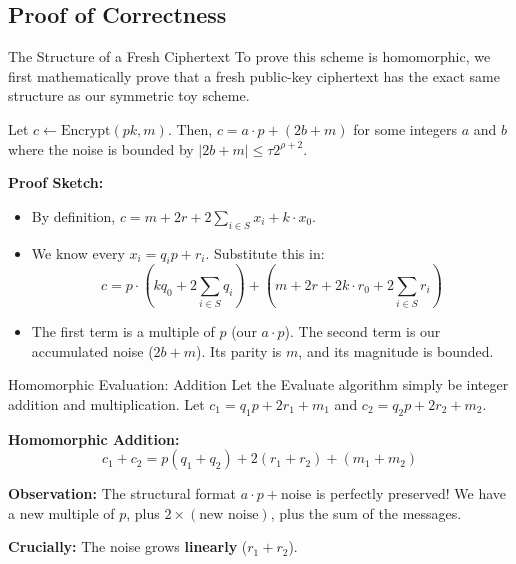 \documentclass[10pt,handout]{beamer}
\begin{document}
\subsection{Proof of Correctness}

\begin{frame}{The Structure of a Fresh Ciphertext}
    To prove this scheme is homomorphic, we first mathematically prove that a fresh public-key ciphertext has the exact same structure as our symmetric toy scheme.
    \pause
    
    \begin{lemma}
    Let $c \leftarrow \text{Encrypt}(pk, m)$. Then, $c = a\cdot p + (2b + m)$ for some integers $a$ and $b$ where the noise is bounded by $|2b+m| \le \tau 2^{\rho+2}$.
    \end{lemma}
    \pause
    
    \vspace{0.3cm}
    \textbf{Proof Sketch:}
    \begin{itemize}
        \item By definition, $c = m + 2r + 2\sum_{i \in S} x_i + k \cdot x_0$.
        \item We know every $x_i = q_i p + r_i$. Substitute this in:
        $$c = p \cdot \left(kq_0 + 2\sum_{i \in S} q_i\right) + \left(m + 2r + 2k \cdot r_0 + 2\sum_{i \in S} r_i\right)$$
        \item The first term is a multiple of $p$ (our $a \cdot p$). The second term is our accumulated noise ($2b+m$). Its parity is $m$, and its magnitude is bounded.
    \end{itemize}
\end{frame}

\begin{frame}{Homomorphic Evaluation: Addition}
    Let the Evaluate algorithm simply be integer addition and multiplication. 
    Let $c_1 = q_1 p + 2r_1 + m_1$ and $c_2 = q_2 p + 2r_2 + m_2$.
    \pause

    \vspace{0.3cm}
    \textbf{Homomorphic Addition:}
    $$c_1 + c_2 = p(q_1 + q_2) + 2(r_1 + r_2) + (m_1 + m_2)$$
    \pause
    
    \vspace{0.3cm}
    \textbf{Observation:}
    The structural format $a\cdot p + \text{noise}$ is perfectly preserved! We have a new multiple of $p$, plus $2 \times (\text{new noise})$, plus the sum of the messages. 
    
    \vspace{0.2cm}
    \textbf{Crucially:} The noise grows \textbf{linearly} ($r_1 + r_2$).
\end{frame}
\end{document}
